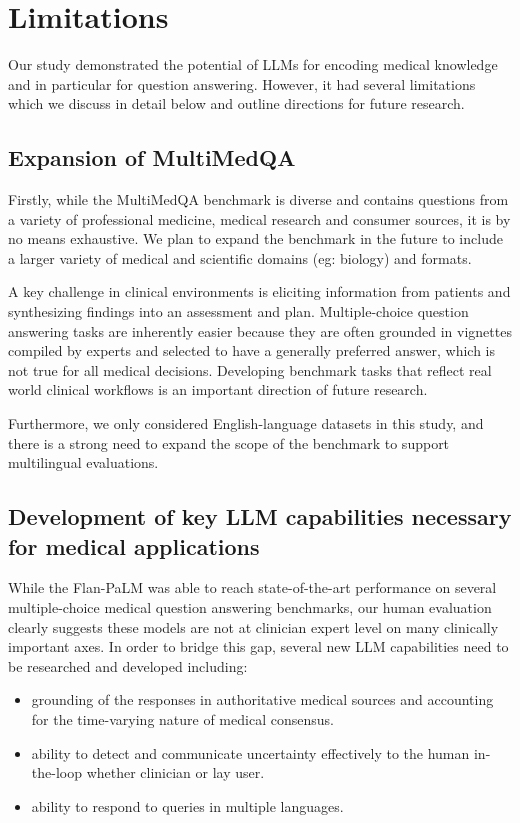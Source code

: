 \section{Limitations}
\label{sec:limitations}
Our study demonstrated the potential of LLMs for encoding medical knowledge and in particular for question answering. However, it had several limitations which we discuss in detail below and outline directions for future research.

\subsection{Expansion of MultiMedQA} Firstly, while the MultiMedQA benchmark is diverse and contains questions from a variety of professional medicine, medical research and consumer sources, it is by no means exhaustive. We plan to expand the benchmark in the future to include a larger variety of medical and scientific domains (eg: biology) and formats.

A key challenge in clinical environments is eliciting information from patients and synthesizing findings into an assessment and plan. Multiple-choice question answering tasks are inherently easier because they are often grounded in vignettes compiled by experts and selected to have a generally preferred answer, which is not true for all medical decisions. Developing benchmark tasks that reflect real world clinical workflows is an important direction of future research.

Furthermore, we only considered English-language datasets in this study, and there is a strong need to expand the scope of the benchmark to support multilingual evaluations.

\subsection{Development of key LLM capabilities necessary for medical applications}

While the Flan-PaLM was able to reach state-of-the-art performance on several multiple-choice medical question answering benchmarks, our human evaluation clearly suggests these models are not at clinician expert level on many clinically important axes. In order to bridge this gap, several new LLM capabilities need to be researched and developed including:

\begin{itemize}
    \item grounding of the responses in authoritative medical sources and accounting for the time-varying nature of medical consensus.
    \item ability to detect and communicate uncertainty effectively to the human in-the-loop whether clinician or lay user. 
    \item ability to respond to queries in multiple languages.
\end{itemize}

